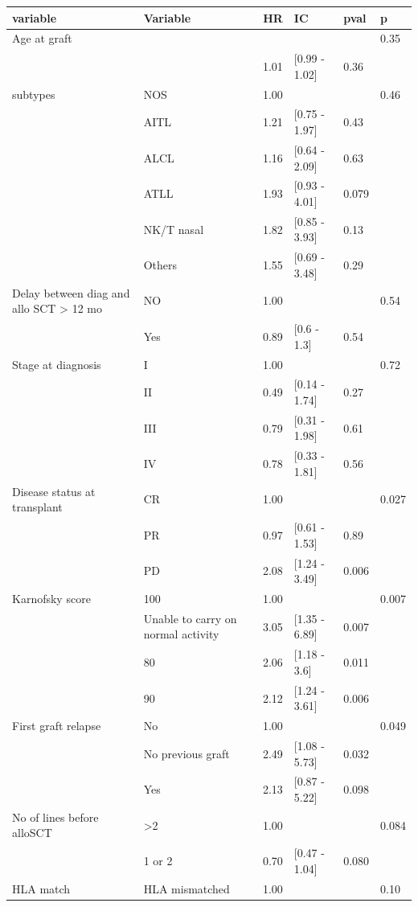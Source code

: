 \documentclass[a4paper,11pt] {article}
\begin{document}
\begin{center}
\begin{landscape}
\begin{longtable}{llrlll}
  \hline
variable & Variable & HR & IC & pval & p \\ 
  \hline
Age at graft &  &  &  &  & 0.35 \\ 
   &  & 1.01 & [0.99 - 1.02] & 0.36 &  \\ 
  subtypes & NOS & 1.00 &  &  & 0.46 \\ 
   & AITL & 1.21 & [0.75 - 1.97] & 0.43 &  \\ 
   & ALCL & 1.16 & [0.64 - 2.09] & 0.63 &  \\ 
   & ATLL & 1.93 & [0.93 - 4.01] & 0.079 &  \\ 
   & NK/T nasal & 1.82 & [0.85 - 3.93] & 0.13 &  \\ 
   & Others & 1.55 & [0.69 - 3.48] & 0.29 &  \\ 
  Delay between diag and allo SCT > 12 mo & NO & 1.00 &  &  & 0.54 \\ 
   & Yes & 0.89 & [0.6 - 1.3] & 0.54 &  \\ 
  Stage at diagnosis & I & 1.00 &  &  & 0.72 \\ 
   & II & 0.49 & [0.14 - 1.74] & 0.27 &  \\ 
   & III & 0.79 & [0.31 - 1.98] & 0.61 &  \\ 
   & IV & 0.78 & [0.33 - 1.81] & 0.56 &  \\ 
  Disease status at transplant & CR & 1.00 &  &  & 0.027 \\ 
   & PR & 0.97 & [0.61 - 1.53] & 0.89 &  \\ 
   & PD & 2.08 & [1.24 - 3.49] & 0.006 &  \\ 
  Karnofsky score & 100 & 1.00 &  &  & 0.007 \\ 
   & Unable to carry on normal activity & 3.05 & [1.35 - 6.89] & 0.007 &  \\ 
   & 80 & 2.06 & [1.18 - 3.6] & 0.011 &  \\ 
   & 90 & 2.12 & [1.24 - 3.61] & 0.006 &  \\ 
  First graft relapse & No & 1.00 &  &  & 0.049 \\ 
   & No previous graft & 2.49 & [1.08 - 5.73] & 0.032 &  \\ 
   & Yes & 2.13 & [0.87 - 5.22] & 0.098 &  \\ 
  No of lines before alloSCT & >2 & 1.00 &  &  & 0.084 \\ 
   & 1 or 2 & 0.70 & [0.47 - 1.04] & 0.080 &  \\ 
  HLA match & HLA mismatched & 1.00 &  &  & 0.10 \\ 

\end{longtable}
\end{landscape}
\end{center}
\end{document}
